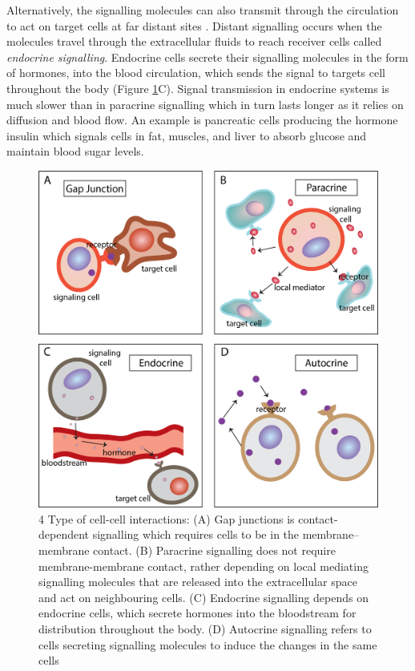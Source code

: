 Alternatively, the signalling molecules can also transmit through the circulation to act on target cells at far distant sites \cite{cooper2004cell, alberts2018molecular}. Distant signalling occurs when the molecules travel through the extracellular fluids to reach receiver cells called \textit{endocrine signalling}. Endocrine cells secrete their signalling molecules in the form of hormones, into the blood circulation, which sends the signal to targets cell throughout the body (Figure \ref{fig:Chap1_figure2}C). Signal transmission in endocrine systems is much slower than in paracrine signalling which in turn lasts longer as it relies on diffusion and blood flow. An example is pancreatic cells producing the hormone insulin which signals cells in fat, muscles, and liver to absorb glucose and maintain blood sugar levels.

\begin{figure}[htp]
    \centering
    \includegraphics[width=0.8\columnwidth]{Chapter1/Figures/Chap1_figure2.png}
    \caption[4 Type of cell-cell interactions]{4 Type of cell-cell interactions: (A) Gap junctions is contact-dependent signalling which requires cells to be in the membrane–membrane contact. (B) Paracrine signalling does not require membrane-membrane contact, rather depending on local mediating signalling molecules that are released into the extracellular space and act on neighbouring cells. (C) Endocrine signalling depends on endocrine cells, which secrete hormones into the bloodstream for distribution throughout the body. (D) Autocrine signalling refers to cells secreting signalling molecules to induce the changes in the same cells}
    \label{fig:Chap1_figure2}
\end{figure}

